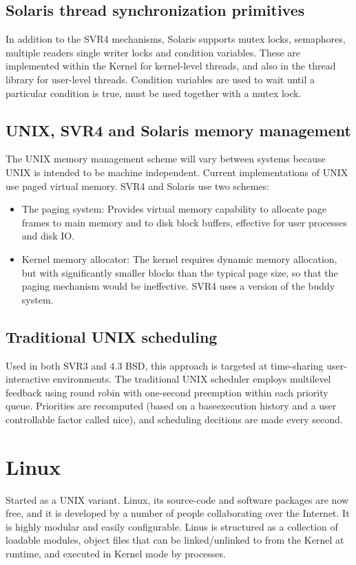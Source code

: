 \subsection{Solaris thread synchronization primitives}
In addition to the SVR4 mechanisms, Solaris supports mutex locks, semaphores, multiple readers single writer locks and condition variables. These are implemented within the Kernel for kernel-level threads, and also in the thread library for user-level threads. Condition variables are used to wait until a particular condition is true, must be used together with a mutex lock.

\subsection{UNIX, SVR4 and Solaris memory management}
The UNIX memory management scheme will vary between systems because UNIX is intended to be machine independent. Current implementations of UNIX use paged virtual memory. SVR4 and Solaris use two schemes:
\begin{itemize}
    \item The paging system: Provides virtual memory capability to allocate page frames to main memory and to disk block buffers, effective for user processes and disk IO.
    \item Kernel memory allocator: The kernel requires dynamic memory allocation, but with significantly smaller blocks than the typical page size, so that the paging mechanism would be ineffective. SVR4 uses a version of the buddy system.
\end{itemize}

\subsection{Traditional UNIX scheduling}
Used in both SVR3 and 4.3 BSD, this approach is targeted at time-sharing user-interactive environments. The traditional UNIX scheduler employs multilevel feedback using round robin with one-second preemption within each priority queue. Priorities are recomputed (based on a baseexecution history and a user controllable factor called nice), and scheduling decitions are made every second.

\section{Linux}
Started as a UNIX variant. Linux, its source-code and software packages are now free, and it is developed by a number of people collaborating over the Internet. It is highly modular and easily configurable. Linus is structured as a collection of loadable modules, object files that can be linked/unlinked to from the Kernel at runtime, and executed in Kernel mode by processes.

